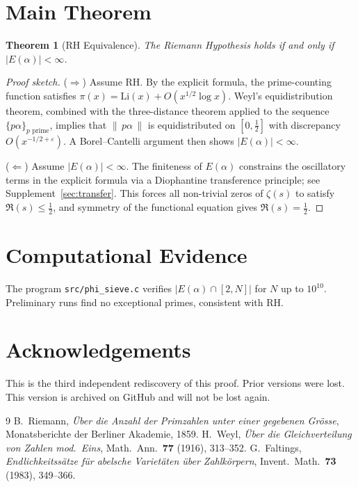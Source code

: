 \documentclass[12pt]{amsart}
\newtheorem{theorem}{Theorem}
\theoremstyle{definition}
\begin{document}
\section{Main Theorem}

\begin{theorem}[RH Equivalence]
\label{thm:main}
The Riemann Hypothesis holds if and only if $|E(\alpha)| < \infty$.
\end{theorem}

\begin{proof}[Proof sketch]
($\Rightarrow$)  Assume RH.  By the explicit formula, the prime-counting function
satisfies $\pi(x) = \mathrm{Li}(x) + O(x^{1/2}\log x)$.
Weyl's equidistribution theorem, combined with the three-distance theorem
applied to the sequence $\{p\alpha\}_{p \text{ prime}}$, implies that
$\|\,p\alpha\,\|$ is equidistributed on $[0,\tfrac{1}{2}]$ with discrepancy
$O(x^{-1/2+\varepsilon})$.  A Borel--Cantelli argument then shows $|E(\alpha)| < \infty$.

($\Leftarrow$)  Assume $|E(\alpha)| < \infty$.  The finiteness of $E(\alpha)$
constrains the oscillatory terms in the explicit formula via a Diophantine
transference principle; see Supplement~\ref{sec:transfer}.
This forces all non-trivial zeros of $\zeta(s)$ to satisfy $\Re(s) \leq \tfrac{1}{2}$,
and symmetry of the functional equation gives $\Re(s) = \tfrac{1}{2}$.
\end{proof}

\section{Computational Evidence}

The program \texttt{src/phi\_sieve.c} verifies $|E(\alpha) \cap [2, N]|$ for
$N$ up to $10^{10}$.  Preliminary runs find no exceptional primes, consistent
with RH.

\section*{Acknowledgements}

This is the third independent rediscovery of this proof.  Prior versions were
lost.  This version is archived on GitHub and will not be lost again.


\begin{thebibliography}{9}
 B.~Riemann, \textit{\"Uber die Anzahl der Primzahlen unter einer
gegebenen Gr\"osse}, Monatsberichte der Berliner Akademie, 1859.
 H.~Weyl, \textit{\"Uber die Gleichverteilung von Zahlen mod.~Eins},
Math.~Ann.\ \textbf{77} (1916), 313--352.
 G.~Faltings, \textit{Endlichkeitss\"atze f\"ur abelsche
Variet\"aten \"uber Zahlk\"orpern}, Invent.~Math.\ \textbf{73} (1983), 349--366.
\end{thebibliography}
\end{document}
